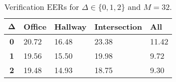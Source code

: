 \begin{table}[h]
    \centering
    \begin{tabular}{|c|M{2cm}|M{2cm}|M{2cm}|M{2cm}|}
    \hline
    $\boldsymbol{\Delta}$ & \bf{Office} & \bf{Hallway} & \bf{Intersection} & \bf{All} \\ 
    \hline 
    \hline
    \bf{0} & 20.72 & 16.48 & 23.38 & 11.42 \\
    \hline
    \bf{1} & 19.56 & 15.50 & 19.98 & 9.72 \\
    \hline
    \bf{2} & 19.48 & 14.93 & 18.75 & 9.30 \\
    \hline
    \end{tabular}
    \caption{Verification EERs for $\Delta \in \{0, 1, 2\}$ and $M = 32$.}
    \label{tab:verify_adapted_mv_M_32}
\end{table}
